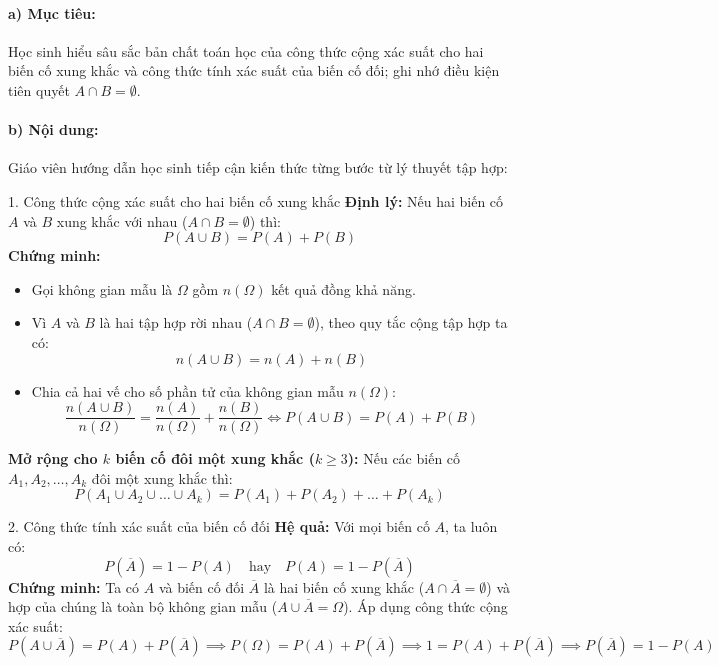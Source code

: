 \documentclass[12pt, a4paper]{article}
\begin{document}
\paragraph{a) Mục tiêu:} Học sinh hiểu sâu sắc bản chất toán học của công thức cộng xác suất cho hai biến cố xung khắc và công thức tính xác suất của biến cố đối; ghi nhớ điều kiện tiên quyết $A \cap B = \emptyset$.

\paragraph{b) Nội dung:} Giáo viên hướng dẫn học sinh tiếp cận kiến thức từng bước từ lý thuyết tập hợp:

\begin{pedabox}{1. Công thức cộng xác suất cho hai biến cố xung khắc}
\textbf{Định lý:} Nếu hai biến cố $A$ và $B$ xung khắc với nhau ($A \cap B = \emptyset$) thì:
\begin{equation}
    P(A \cup B) = P(A) + P(B)
\end{equation}
\textbf{Chứng minh:}
\begin{itemize}[leftmargin=0.5cm]
    \item Gọi không gian mẫu là $\Omega$ gồm $n(\Omega)$ kết quả đồng khả năng.
    \item Vì $A$ và $B$ là hai tập hợp rời nhau ($A \cap B = \emptyset$), theo quy tắc cộng tập hợp ta có:
    $$n(A \cup B) = n(A) + n(B)$$
    \item Chia cả hai vế cho số phần tử của không gian mẫu $n(\Omega)$:
    $$\dfrac{n(A \cup B)}{n(\Omega)} = \dfrac{n(A)}{n(\Omega)} + \dfrac{n(B)}{n(\Omega)} \iff P(A \cup B) = P(A) + P(B)$$
\end{itemize}
\textbf{Mở rộng cho $k$ biến cố đôi một xung khắc ($k \geq 3$):}
Nếu các biến cố $A_1, A_2, \dots, A_k$ đôi một xung khắc thì:
\begin{equation}
    P(A_1 \cup A_2 \cup \dots \cup A_k) = P(A_1) + P(A_2) + \dots + P(A_k)
\end{equation}
\end{pedabox}

\begin{pedabox}{2. Công thức tính xác suất của biến cố đối}
\textbf{Hệ quả:} Với mọi biến cố $A$, ta luôn có:
\begin{equation}
    P(\overline{A}) = 1 - P(A) \quad \text{hay} \quad P(A) = 1 - P(\overline{A})
\end{equation}
\textbf{Chứng minh:} Ta có $A$ và biến cố đối $\overline{A}$ là hai biến cố xung khắc ($A \cap \overline{A} = \emptyset$) và hợp của chúng là toàn bộ không gian mẫu ($A \cup \overline{A} = \Omega$).
Áp dụng công thức cộng xác suất:
$$P(A \cup \overline{A}) = P(A) + P(\overline{A}) \implies P(\Omega) = P(A) + P(\overline{A}) \implies 1 = P(A) + P(\overline{A}) \implies P(\overline{A}) = 1 - P(A)$$
\end{pedabox}
\end{document}
